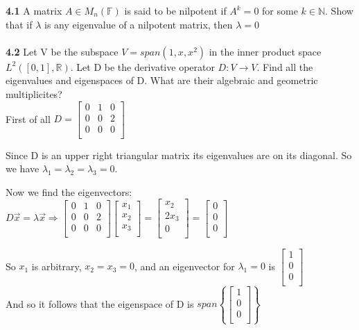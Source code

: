 \documentclass[letterpaper,12pt]{article}
\theoremstyle{definition}
\begin{document}
\textbf{4.1}
A matrix $A\in M_n(\mathbb{F})$ is said to be nilpotent if $A^k=0$ for some $k\in \mathbb{N}$. Show that if $\lambda$ is any eigenvalue of a nilpotent matrix, then $\lambda=0$\\
\\




\textbf{4.2}
Let V be the subspace $V = span(1,x,x^2)$ in the inner product space $L^2([0,1],\mathbb{R})$. Let D be the derivative operator $D: V \rightarrow V$. Find all the eigenvalues and eigenspaces of D. What are their algebraic and geometric multiplicites?\\

First of all $D = 
\begin{bmatrix}
    0 & 1 & 0\\
   0 & 0 & 2\\
   0 & 0 & 0\\
  \end{bmatrix}
$

Since D is an upper right triangular matrix its eigenvalues are on its diagonal. So we have $\lambda_1 = \lambda_2 = \lambda_3 = 0$.

Now we find the eigenvectors: $D\vec x = \lambda \vec x \Rightarrow 
\begin{bmatrix}
    0 & 1 & 0\\
   0 & 0 & 2\\
   0 & 0 & 0\\
  \end{bmatrix} 
  \begin{bmatrix}
    x_1\\
   x_2\\
   x_3\\
  \end{bmatrix} = 
  \begin{bmatrix}
   x_2\\
   2x_3\\
   0 \\
  \end{bmatrix} =
  \begin{bmatrix}
    0 \\
    0 \\
    0 \\
  \end{bmatrix} $
  
 So $x_1$ is arbitrary, $x_2 = x_3 = 0$, and an eigenvector for $\lambda_1 = 0$ is $ \begin{bmatrix}
    1\\
    0 \\
    0 \\
  \end{bmatrix}$\\
  And so it follows that the eigenspace of D is $span\left\{ \begin{bmatrix}
    1\\
    0 \\
    0 \\
  \end{bmatrix} \right\}$
  
\end{document}
